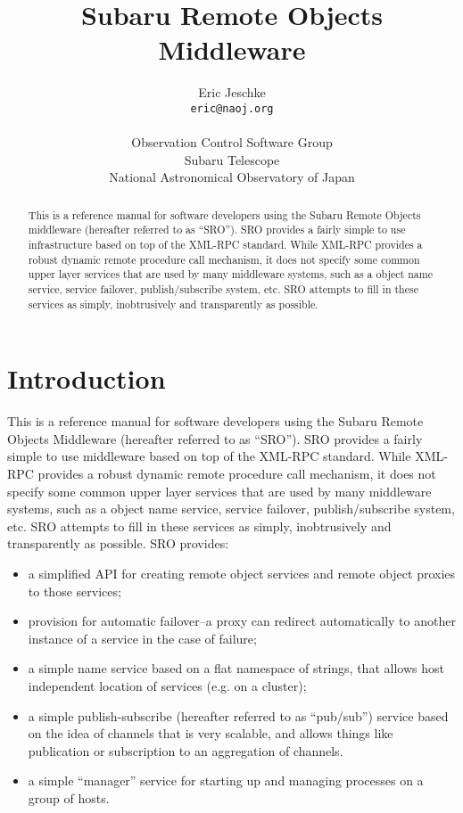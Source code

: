 \documentclass[11pt]{report}
\title{Subaru Remote Objects Middleware}
\author{Eric Jeschke\\
{\tt eric@naoj.org}\\
\\
Observation Control Software Group\\
Subaru Telescope\\
National Astronomical Observatory of Japan}
\begin{document}
 
\maketitle 

\begin{abstract}
This is a reference manual for software developers using the Subaru
Remote Objects middleware (hereafter referred to as ``SRO'').  SRO
provides a fairly simple to use infrastructure based on top of the XML-RPC
standard.  While XML-RPC provides a robust dynamic remote procedure call
mechanism, it does not specify some common upper layer services that are
used by many middleware systems, such as a object name service, service
failover, publish/subscribe system, etc.  SRO attempts to fill in these
services as simply, inobtrusively and transparently as possible.
\end{abstract}

\tableofcontents
\setcounter{tocdepth}{3}

\newpage

\chapter{Introduction}
This is a reference manual for software developers using the Subaru
Remote Objects Middleware (hereafter referred to as ``SRO'').  SRO
provides a fairly simple to use middleware based on top of the XML-RPC
standard.  While XML-RPC provides a robust dynamic remote procedure call
mechanism, it does not specify some common upper layer services that are
used by many middleware systems, such as a object name service, service
failover, publish/subscribe system, etc.  SRO attempts to fill in these
services as simply, inobtrusively and transparently as possible.
SRO provides:
\begin{itemize}
\item a simplified API for creating remote object services and
  remote object proxies to those services;
\item provision for automatic failover--a proxy can redirect
  automatically to another instance of a service in the case of failure;
\item a simple name service based on a flat namespace of strings, that
  allows host independent location of services (e.g. on a cluster);
\item a simple publish-subscribe (hereafter referred to as ``pub/sub'')
  service based on the idea of channels that is very scalable, and
  allows things like publication or subscription to an aggregation of
  channels. 
\item a simple ``manager'' service for starting up and managing
  processes on a group of hosts.
\end{itemize}
\end{document}
